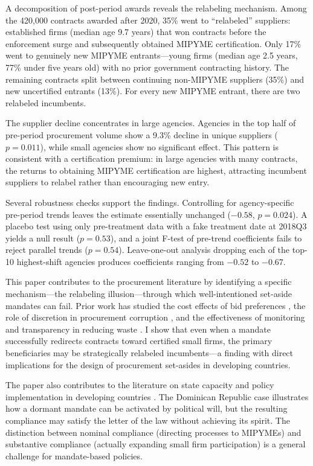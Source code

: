 \documentclass[12pt]{article}
\begin{document}
A decomposition of post-period awards reveals the relabeling mechanism. Among the 420,000 contracts awarded after 2020, 35\% went to ``relabeled'' suppliers: established firms (median age 9.7 years) that won contracts before the enforcement surge and subsequently obtained MIPYME certification. Only 17\% went to genuinely new MIPYME entrants---young firms (median age 2.5 years, 77\% under five years old) with no prior government contracting history. The remaining contracts split between continuing non-MIPYME suppliers (35\%) and new uncertified entrants (13\%). For every new MIPYME entrant, there are two relabeled incumbents.

The supplier decline concentrates in large agencies. Agencies in the top half of pre-period procurement volume show a 9.3\% decline in unique suppliers ($p = 0.011$), while small agencies show no significant effect. This pattern is consistent with a certification premium: in large agencies with many contracts, the returns to obtaining MIPYME certification are highest, attracting incumbent suppliers to relabel rather than encouraging new entry.

Several robustness checks support the findings. Controlling for agency-specific pre-period trends leaves the estimate essentially unchanged ($-0.58$, $p = 0.024$). A placebo test using only pre-treatment data with a fake treatment date at 2018Q3 yields a null result ($p = 0.53$), and a joint F-test of pre-trend coefficients fails to reject parallel trends ($p = 0.54$). Leave-one-out analysis dropping each of the top-10 highest-shift agencies produces coefficients ranging from $-0.52$ to $-0.67$.

This paper contributes to the procurement literature by identifying a specific mechanism---the relabeling illusion---through which well-intentioned set-aside mandates can fail. Prior work has studied the cost effects of bid preferences \citep{krasnokutskaya2011bid, marion2007bid}, the role of discretion in procurement corruption \citep{szucs2023procurement, bandiera2009active, decarolis2020rules}, and the effectiveness of monitoring and transparency in reducing waste \citep{olken2007monitoring, ferraz2011electoral, coviello2018publicity}. I show that even when a mandate successfully redirects contracts toward certified small firms, the primary beneficiaries may be strategically relabeled incumbents---a finding with direct implications for the design of procurement set-asides in developing countries.

The paper also contributes to the literature on state capacity and policy implementation in developing countries \citep{best2023individuals, banerjee2020can, colonnelli2020corruption}. The Dominican Republic case illustrates how a dormant mandate can be activated by political will, but the resulting compliance may satisfy the letter of the law without achieving its spirit. The distinction between nominal compliance (directing processes to MIPYMEs) and substantive compliance (actually expanding small firm participation) is a general challenge for mandate-based policies.
\end{document}
